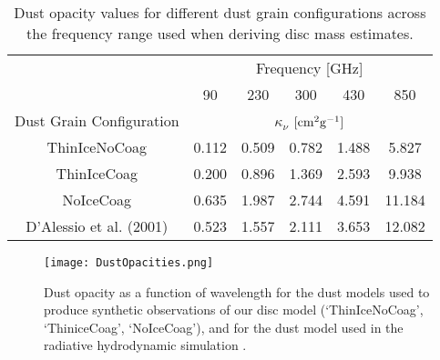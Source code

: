 \documentclass[fleqn,usenatbib]{mnras}
\begin{document}
\begin{table}
    \centering
    \begin{tabular}{cccccc}
        \cmidrule(l){2-6}
                                                      & \multicolumn{5}{c}{Frequency [GHz]}       \\ \cmidrule(l){2-6}
                                                      & 90       & 230    & 300    & 430    & 850     \\ \midrule
        \multicolumn{1}{C{2cm}}{Dust Grain Configuration} & \multicolumn{5}{c}{$\kappa_\nu$ $\rm [cm^2g^{-1}]$} \\ \midrule
        \multicolumn{1}{c}{ThinIceNoCoag}                & 0.112    & 0.509  & 0.782  & 1.488  & 5.827   \\ 
        \multicolumn{1}{c}{ThinIceCoag}                  & 0.200    & 0.896  & 1.369  & 2.593  & 9.938   \\
        \multicolumn{1}{c}{NoIceCoag}                    & 0.635    & 1.987  & 2.744  & 4.591  & 11.184  \\
        \multicolumn{1}{C{2cm}}{D'Alessio et al. (2001)} & 0.523    & 1.557  & 2.111  & 3.653  & 12.082  \\
        \bottomrule
    \end{tabular}
    \caption{Dust opacity values for different dust grain configurations across the frequency range used when deriving disc mass estimates.}
    \label{tab:freqkappas}
\end{table}

\begin{figure}
    \texttt{[image: DustOpacities.png]}
    \caption{Dust opacity as a function of wavelength for the dust models used to produce synthetic observations of our disc model (`ThinIceNoCoag', `ThiniceCoag', `NoIceCoag'), and for the dust model used in the radiative hydrodynamic simulation \citep{D'Alessio&Calvet2001}.}
    \label{fig:opacities}
\end{figure}
\end{document}

